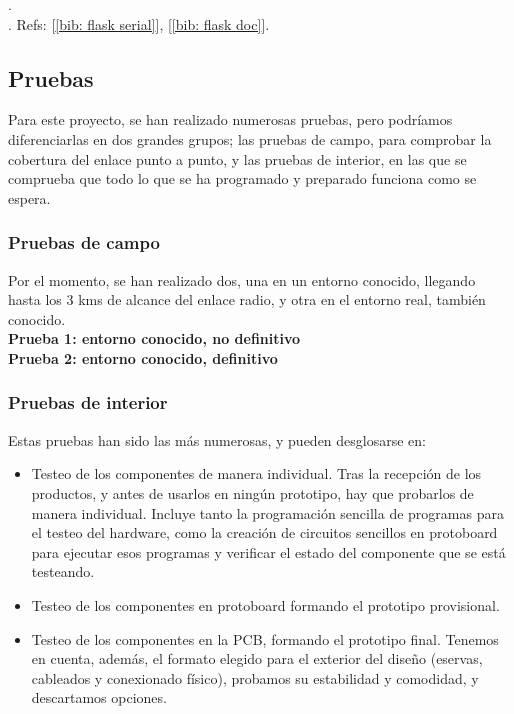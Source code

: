 \documentclass[12pt]{article}
\begin{document}
	. \\
	
	. Refs: [\ref{bib: flask serial}], [\ref{bib: flask doc}].
	
	\pagebreak
	
	\subsection[Pruebas]{Pruebas}
	
	\noindent Para este proyecto, se han realizado numerosas pruebas, pero podríamos diferenciarlas en dos grandes grupos; las pruebas de campo, para comprobar la cobertura del enlace punto a punto, y las pruebas de interior, en las que se comprueba que todo lo que se ha programado y preparado funciona como se espera. \\
	
	\subsubsection{Pruebas de campo}
	
	\noindent Por el momento, se han realizado dos, una en un entorno conocido, llegando hasta los 3 kms de alcance del enlace radio, y otra en el entorno real, también conocido. \\
	
	\noindent \textbf{Prueba 1: entorno conocido, no definitivo} \\
	
	\noindent \textbf{Prueba 2: entorno conocido, definitivo} \\

	\subsubsection{Pruebas de interior}
	
	\noindent Estas pruebas han sido las más numerosas, y pueden desglosarse en: \\
	
	\begin{itemize}
		\item Testeo de los componentes de manera individual. Tras la recepción de los productos, y antes de usarlos en ningún prototipo, hay que probarlos de manera individual. Incluye tanto la programación sencilla de programas para el testeo del hardware, como la creación de circuitos sencillos en protoboard para ejecutar esos programas y verificar el estado del componente que se está testeando.
		\item Testeo de los componentes en protoboard formando el prototipo provisional.
		\item Testeo de los componentes en la PCB, formando el prototipo final. Tenemos en cuenta, además, el formato elegido para el exterior del diseño (eservas, cableados y conexionado físico), probamos su estabilidad y comodidad, y descartamos opciones.
	\end{itemize}
	
\end{document}
